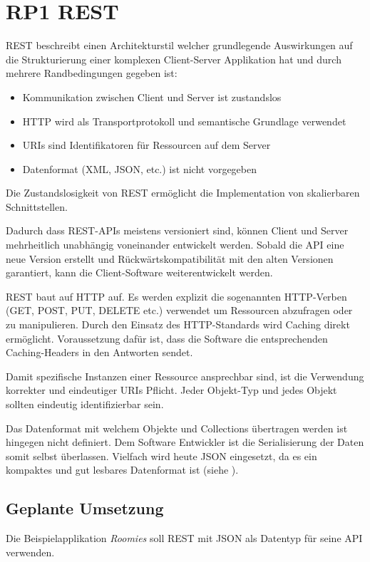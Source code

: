 \section{RP1 REST}
\label{sec:principle-rp1-rest}

\gls{REST} \cite{REST} beschreibt einen Architekturstil welcher grundlegende Auswirkungen auf die Strukturierung einer komplexen Client-Server Applikation hat und durch mehrere Randbedingungen gegeben ist:
\begin{itemize}
	\item Kommunikation zwischen Client und Server ist zustandslos
	\item HTTP wird als Transportprotokoll und semantische Grundlage verwendet
	\item \glspl{URI} sind Identifikatoren für Ressourcen auf dem Server
	\item Datenformat (XML, JSON, etc.) ist nicht vorgegeben
\end{itemize}

Die Zustandslosigkeit von REST ermöglicht die Implementation von skalierbaren Schnittstellen.

Dadurch dass REST-APIs meistens versioniert sind, können Client und Server mehrheitlich unabhängig voneinander entwickelt werden.
Sobald die API eine neue Version erstellt und Rückwärtskompatibilität mit den alten Versionen garantiert, kann die Client-Software weiterentwickelt werden.

REST baut auf HTTP auf. Es werden explizit die sogenannten HTTP-Verben (GET, POST, PUT, DELETE etc.) verwendet um Ressourcen abzufragen oder zu manipulieren.
Durch den Einsatz des HTTP-Standards wird Caching direkt ermöglicht. Voraussetzung dafür ist, dass die Software die entsprechenden Caching-Headers in den Antworten sendet.

Damit spezifische Instanzen einer Ressource ansprechbar sind, ist die Verwendung korrekter und eindeutiger \glspl{URI} Pflicht. Jeder Objekt-Typ und jedes Objekt sollten eindeutig identifizierbar sein.

Das Datenformat mit welchem Objekte und Collections übertragen werden ist hingegen nicht definiert. Dem Software Entwickler ist die Serialisierung der Daten somit selbst überlassen.
Vielfach wird heute \gls{JSON} eingesetzt, da es ein kompaktes und gut lesbares Datenformat ist (siehe \cite{ProgrammableWebByeXML}).

\subsection*{Geplante Umsetzung}
Die Beispielapplikation \emph{Roomies} soll REST mit JSON als Datentyp für seine API verwenden.

